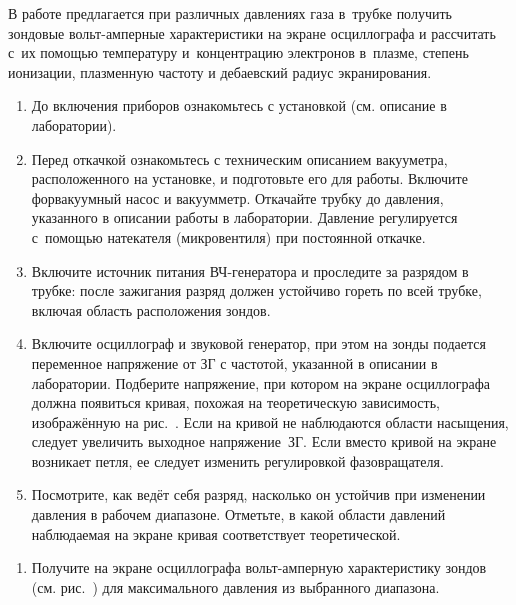 \begin{lab:task}

В работе предлагается при различных давлениях газа в~трубке получить зондовые вольт-амперные характеристики на экране
осциллографа и рассчитать с~их помощью температуру и~концентрацию электронов в~плазме, степень ионизации, плазменную
частоту и дебаевский радиус экранирования.


\begin{enumerate}
\item До включения приборов ознакомьтесь с установкой (см. описание в лаборатории). 

\item Перед откачкой ознакомьтесь с техническим описанием вакууметра, расположенного на установке, и подготовьте его для работы. Включите форвакуумный насос и вакуумметр. Откачайте трубку до давления, указанного в описании работы в лаборатории. Давление
регулируется с~помощью натекателя (микровентиля) при постоянной откачке.

\item Включите источник питания ВЧ-генератора и проследите за разрядом в трубке: после зажигания разряд должен устойчиво
гореть по всей трубке, включая область расположения зондов.


\item  Включите осциллограф и звуковой генератор, при этом на зонды подается переменное напряжение от ЗГ с частотой, указанной в описании в лаборатории. Подберите напряжение, при котором на экране осциллографа должна появиться кривая, похожая на теоретическую зависимость, изображённую на рис.~.
Если на кривой не наблюдаются области насыщения, следует увеличить выходное напряжение~ЗГ. Если вместо кривой на экране возникает петля, ее следует изменить регулировкой фазовращателя.

\item Посмотрите, как ведёт себя разряд, насколько он устойчив при изменении давления в
рабочем диапазоне. Отметьте, в какой области давлений наблюдаемая на экране кривая соответствует
теоретической.
\end{enumerate}


\begin{enumerate}
\item Получите на экране осциллографа вольт-амперную характеристику зондов (см. рис.~) для максимального давления из выбранного диапазона.


\end{enumerate}
\end{lab:task}
